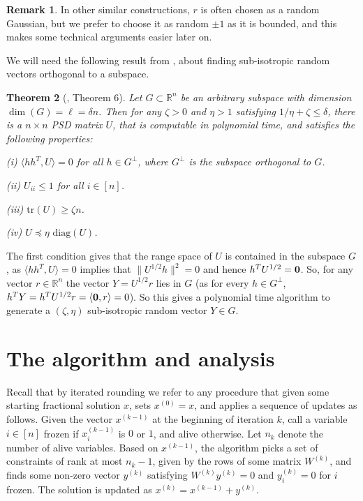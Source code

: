 \documentclass[11pt]{article}
\newcommand{\ip}[1]{\langle #1 \rangle}
\newtheorem{theorem}{Theorem}[section]
\theoremstyle{definition}
\newtheorem{remark}[theorem]{Remark}
\newcommand{\R}{{\mathbb R}}
\begin{document}
%
%
\begin{remark}   %
In other similar constructions, $r$ is often chosen as a random Gaussian, but we prefer to choose it as random $\pm 1$ as it is bounded, and this makes some technical arguments easier later on.
\end{remark}

We will need the following result from \cite{BG17}, about finding sub-isotropic random vectors orthogonal to a subspace.
\begin{theorem}[\cite{BG17}, Theorem 6]
\label{thm:bg17}
Let $G \subset \R^n$ be an arbitrary subspace with dimension $\dim(G)=\ell =  \delta n$. Then for any $\zeta>0 $ and $\eta>1$ satisfying $1/\eta + \zeta \leq \delta$, there is a $n \times n$ PSD matrix $U$, that is computable in polynomial time, and satisfies the following properties:

(i) $\langle  hh^T,U \rangle =0$  for all $h \in G^{\perp}$, where $G^{\perp}$ is the subspace orthogonal to $G$.

(ii)
$U_{ii} \leq 1$ for all $i\in [n]$.

(iii) $\textrm{tr}(U) \geq \zeta n$.

(iv) $ U\preceq \eta \text{ diag}(U)$.
\end{theorem}
The first condition gives that the range space of $U$ is contained in the subspace $G$, as $\langle  hh^T,U \rangle = 0$ implies that $\| U^{1/2} h \|^2=0$ and hence $h^T U^{1/2}=\bf{0}$. So, for any vector $r \in \R^n$ the vector $Y= U^{1/2} r$ lies in $G$ (as for every $h \in G^{\perp}$, $h^T Y=  h^T U^{1/2} r = \ip{{\bf 0}, r} = 0$).
So this gives a polynomial time algorithm to generate a $(\zeta,\eta)$ sub-isotropic random vector $Y \in G$.
%
%



\section{The algorithm and analysis}
Recall that by iterated rounding we refer to any procedure that
given some starting fractional solution $x$, sets $x^{(0)}=x$, and 
applies a sequence of updates as follows.
Given the vector $x^{(k-1)}$ at the beginning of iteration $k$, call a variable $i \in [n]$
frozen if $x_i^{(k-1)}$ is $0$ or $1$, and alive otherwise. 
%
Let $n_k$ denote the number of alive variables.
Based on $x^{(k-1)}$, the algorithm picks a set of constraints of rank at most $n_k-1$,
given by the rows of some matrix $W^{(k)}$, and finds some non-zero vector $y^{(k)}$ satisfying $W^{(k)} y^{(k)} =0$ and $y^{(k)}_i=0$ for $i$ frozen.
The solution is updated as $x^{(k)} = x^{(k-1)} + y^{(k)}$.
\end{document}
